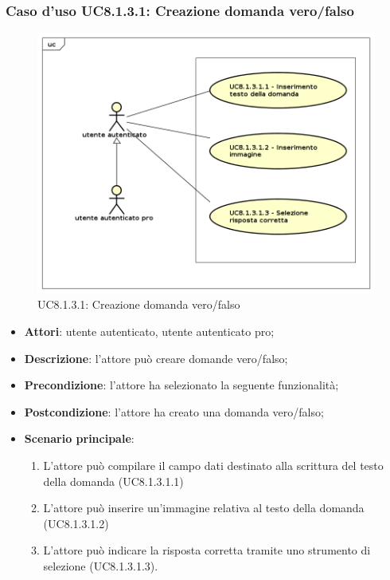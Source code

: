 \subsubsection{Caso d'uso UC8.1.3.1: Creazione domanda vero/falso}
	\label{UC8.1.3.1}
	\begin{figure}[h]
		\centering
			\includegraphics[scale=0.45,keepaspectratio]{UML/UC8_1_3_1.png}
		\caption{UC8.1.3.1: Creazione domanda vero/falso}
	\end{figure}
	\FloatBarrier
	\begin{itemize}
		\item
			\textbf{Attori}: utente autenticato, utente autenticato pro;
		\item		
			\textbf{Descrizione}: l'attore può creare domande vero/falso;
		\item
			\textbf{Precondizione}: l'attore ha selezionato la seguente funzionalità; 
		\item
			\textbf{Postcondizione}: l'attore ha creato una domanda vero/falso;
		\item
			\textbf{Scenario principale}:
	       		\begin{enumerate}
	       			\item
	       			L'attore può compilare il campo dati destinato alla scrittura del testo della domanda (UC8.1.3.1.1)
	       			\item
	       			L'attore può inserire un'immagine relativa al testo della domanda (UC8.1.3.1.2)
					\item
					L'attore può indicare la risposta corretta tramite uno strumento di selezione (UC8.1.3.1.3).
	 			\end{enumerate}
	\end{itemize}


